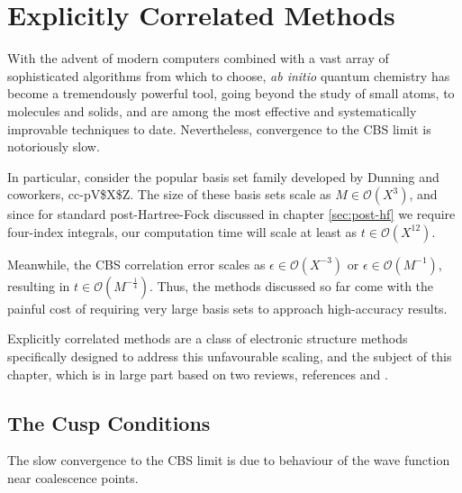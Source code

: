 \chapter{Explicitly Correlated Methods}
\label{chap:explicit}


With the advent of modern computers combined with a vast array of sophisticated algorithms from which to choose, \emph{ab initio} quantum chemistry has become a tremendously powerful tool, going beyond the study of small atoms, to molecules and solids, and are among the most effective and systematically improvable techniques to date. Nevertheless, convergence to the \gls{CBS} limit is notoriously slow.

In particular, consider the popular basis set family developed by Dunning and coworkers, \gls{cc-pV$X$Z}.\cite{dunningGaussian1989a,woonGaussian1993,woonGaussian1994,petersonBenchmark1994,wilsonGaussian1996}
The size of these basis sets scale as $M\in\mathcal{O}(X^3)$, and since for standard post-Hartree-Fock discussed in chapter \ref{sec:post-hf} we require four-index integrals, our computation time will scale at least as $t\in\mathcal{O}(X^{12})$.\cite{klopperR122007}

Meanwhile, the \gls{CBS} correlation error scales as $\epsilon\in\mathcal{O}(X^{-3})$ \cite{helgakerBasisset1997,halkierBasisset1998} or $\epsilon\in\mathcal{O}(M^{-1})$,\cite{klopperInitio1995} resulting in $t\in\mathcal{O}(M^{-\frac 14})$. Thus, the methods discussed so far come with the painful cost of requiring very large basis sets to approach high-accuracy results.

Explicitly correlated methods are a class of electronic structure methods specifically designed to address this unfavourable scaling, and the subject of this chapter, which is in large part based on two reviews, references  and .


\section{The Cusp Conditions}
\label{sec:cusp}

The slow convergence to the \gls{CBS} limit is due to behaviour of the wave function near coalescence points.

